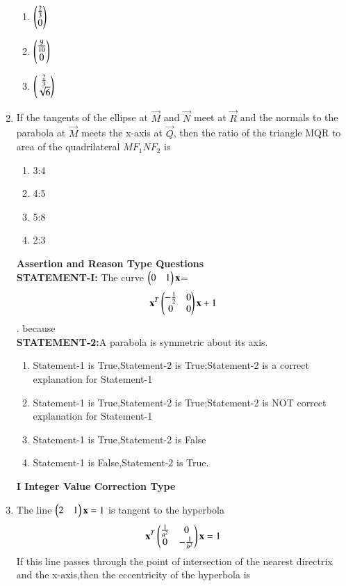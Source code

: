\begin{enumerate}[label=\arabic*.,ref=\thesubsection.\theenumi]
\begin{enumerate}
    \item $\begin{pmatrix}\frac{2}{3}\\0\end{pmatrix}$
    \item $\begin{pmatrix}\frac{9}{10}\\0\end{pmatrix}$
    \item $\begin{pmatrix}\frac{2}{3}\\\sqrt{6}\end{pmatrix}$
   \end{enumerate}
   \item If the tangents of the ellipse at $\vec{M}$ and $\vec{N}$ meet at $\vec{R}$ and the normals to the parabola at $\vec{M}$ meets the x-axis at $\vec{Q}$, then the ratio of the triangle MQR to area of the quadrilateral $M F_1 N F_2$ is
    \begin{enumerate}
    \item 3:4
    \item 4:5
    \item 5:8
    \item 2:3
   \end{enumerate}
   {\textbf{Assertion and Reason Type Questions}}\\
    \textbf{STATEMENT-I:}
    The curve $\begin{pmatrix}0&1\end{pmatrix}\mathbf{x}$=
    \begin{align}
    \mathbf{x}^T\begin{pmatrix}-\frac{1}{2}&0\\0&0\end{pmatrix}\mathbf{x}+1
    \end{align}. because\\
    \textbf{STATEMENT-2:}A parabola is symmetric about its axis.
    \begin{enumerate}
    \item Statement-1 is True,Statement-2 is True;Statement-2 is a correct explanation for Statement-1
    \item Statement-1 is True,Statement-2 is True;Statement-2 is NOT correct explanation for Statement-1
    \item Statement-1 is True,Statement-2 is False
    \item Statement-1 is False,Statement-2 is True.
    \end{enumerate}
   {\textbf{I   Integer Value Correction Type}}
    \item The line $\begin{pmatrix}2&1\end{pmatrix}\mathbf{x}=1$ is tangent to the hyperbola
    \begin{align}
    \mathbf{x}^T\begin{pmatrix}\frac{1}{a^2}&0\\0&-\frac{1}{b^2}\end{pmatrix}\mathbf{x}=1
    \end{align}
    If this line passes through the point of intersection of the nearest directrix and the x-axis,then the eccentricity of the hyperbola is 

\end{enumerate}
